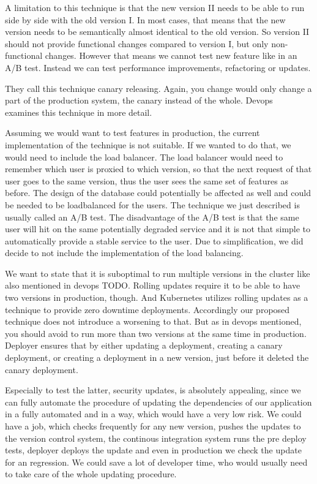 A limitation to this technique is that the new version II needs to be able to run side by
side with the old version I. In most cases, that means that the new version needs to be
semantically almost identical to the old version. So version II should not provide
functional changes compared to version I, but only non-functional changes. However that
means we cannot test new feature like in an A/B test. Instead we can test performance
improvements, refactoring or updates.

They call this technique canary releasing. Again, you change would only change a part of
the production system, the canary instead of the whole. Devops~\cite{cd_humble_deploy}
examines this technique in more detail.

Assuming we would want to test features in production, the current implementation of the
technique is not suitable. If we wanted to do that, we would need to include the
load balancer. The load balancer would need to remember which user is proxied to which
version, so that the next request of that user goes to the same version, thus the user
sees the same set of features as before. The design of the database could potentially be
affected as well and could be needed to be loadbalanced for the users. The technique we
just described is usually called an A/B test. The disadvantage of the A/B test is that the
same user will hit on the same potentially degraded service and it is not that simple to
automatically provide a stable service to the user. Due to simplification, we did decide
to not include the implementation of the load balancing.

We want to state that it is suboptimal to run multiple versions in the cluster like also
mentioned in devops TODO. Rolling updates require it to be able to have two versions in
production, though. And Kubernetes utilizes rolling updates as a technique to provide zero
downtime deployments. Accordingly our proposed technique does not introduce a worsening to
that. But as in devops mentioned, you should avoid to run more than two versions at the
same time in production. Deployer ensures that by either updating a deployment, creating a
canary deployment, or creating a deployment in a new version, just before it deleted the
canary deployment.

Especially to test the latter, security updates, is absolutely appealing, since we can
fully automate the procedure of updating the dependencies of our application in a fully
automated and in a way, which would have a very low risk. We could have a job, which
checks frequently for any new version, pushes the updates to the version control system,
the continous integration system runs the pre deploy tests, deployer deploys the update
and even in production we check the update for an regression. We could save a lot of
developer time, who would usually need to take care of the whole updating procedure.


